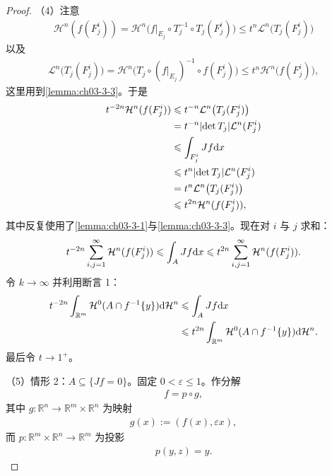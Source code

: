 \documentclass[../../main.tex]{subfiles}%
\begin{document}
\begin{proof}
（4）注意
\begin{align*}
\mathcal{H}^n(f(F_j^i))=\mathcal{H}^n\bigl(f|_{E_j}\circ T_j^{-1}\circ T_j(F_j^i)\bigr)\leqslant t^n\mathcal{L}^n\bigl(T_j(F_j^i)\bigr)
\end{align*}
以及
\begin{align*}
\mathcal{L}^n\bigl(T_j(F_j^i)\bigr)=\mathcal{H}^n\bigl(T_j\circ(f|_{E_j})^{-1}\circ f(F_j^i)\bigr)\leqslant t^n\mathcal{H}^n\bigl(f(F_j^i)\bigr),
\end{align*}
这里用到\cref{lemma:ch03-3-3}。于是%
\begin{align*}
t^{-2n}\mathcal{H}^n(f(F_j^i))&\leqslant t^{-n}\mathcal{L}^n\bigl(T_j(F_j^i)\bigr)\\
&=t^{-n}\lvert\det T_j\rvert\mathcal{L}^n(F_j^i)\\
&\leqslant\int_{F_j^i}Jf\mathrm{d} x\\
&\leqslant t^n\lvert\det T_j\rvert\mathcal{L}^n(F_j^i)\\
&=t^n\mathcal{L}^n\bigl(T_j(F_j^i)\bigr)\\
&\leqslant t^{2n}\mathcal{H}^n(f(F_j^i)),
\end{align*}
其中反复使用了\cref{lemma:ch03-3-1}与\cref{lemma:ch03-3-3}。现在对 $i$ 与 $j$ 求和：%
\begin{align*}
t^{-2n}\sum_{i,j=1}^{\infty}\mathcal{H}^n(f(F_j^i))\leqslant\int_AJf\mathrm{d} x\leqslant t^{2n}\sum_{i,j=1}^{\infty}\mathcal{H}^n(f(F_j^i)).
\end{align*}
令 $k\to\infty$ 并利用断言 1：
\begin{align*}
t^{-2n}\int_{\mathbb{R}^m}\mathcal{H}^0(A\cap f^{-1}\{y\})\mathrm{d}\mathcal{H}^n
&\leqslant\int_AJf\mathrm{d} x\\
&\leqslant t^{2n}\int_{\mathbb{R}^m}\mathcal{H}^0(A\cap f^{-1}\{y\})\mathrm{d}\mathcal{H}^n .
\end{align*}
最后令 $t\to1^+$。

（5）情形 2：$A\subseteq\{Jf=0\}$。固定 $0<\varepsilon\leqslant1$。作分解
\begin{align*}
f=p\circ g,
\end{align*}
其中 $g:\mathbb{R}^n\to\mathbb{R}^m\times\mathbb{R}^n$ 为映射
\begin{align*}
g(x):=(f(x),\varepsilon x),
\end{align*}
而 $p:\mathbb{R}^m\times\mathbb{R}^n\to\mathbb{R}^m$ 为投影
\begin{align*}
p(y,z)=y .
\end{align*}


\end{proof}
\end{document}
